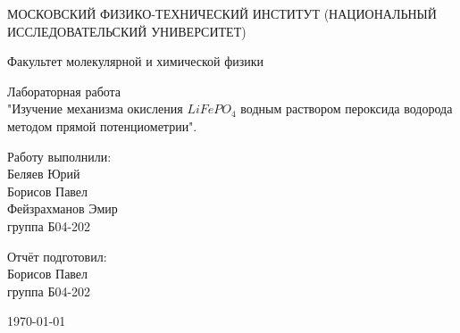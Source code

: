 \documentclass[a4paper,12pt]{article} %
\date{\today}
\begin{document}
\begin{titlepage}
	\begin{center}
		{\large МОСКОВСКИЙ ФИЗИКО-ТЕХНИЧЕСКИЙ ИНСТИТУТ (НАЦИОНАЛЬНЫЙ ИССЛЕДОВАТЕЛЬСКИЙ УНИВЕРСИТЕТ)}
	\end{center}
	\begin{center}
		{\large Факультет молекулярной и химической физики}
	\end{center}
	
	
	\vspace{4.5cm}
	{\huge
		\begin{center}
			{Лабораторная работа }\\
                {"Изучение механизма окисления $LiFePO_4$ водным раствором пероксида водорода методом прямой потенциометрии".}\\
		\end{center}
	}
	\vspace{3cm}
	\begin{flushright}
		{\LARGE Работу выполнили:\\ Беляев Юрий \\ Борисов Павел  \\ Фейзрахманов Эмир \\
			\vspace{0.2cm}
			группа Б04-202}
	\end{flushright}
	\begin{flushright}
		{\LARGE Отчёт подготовил:\\ Борисов Павел  \\
			\vspace{0.2cm}
			группа Б04-202}
	\end{flushright}
	\vspace{4cm}
	\begin{center}
		\today
	\end{center}
\end{titlepage}
\end{document}
